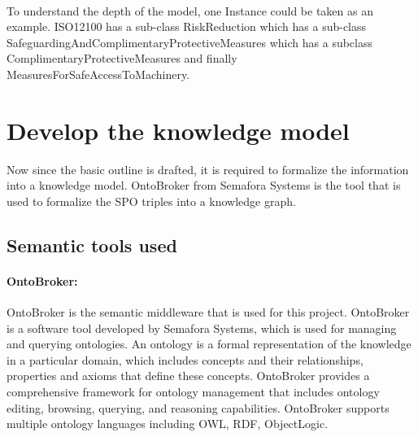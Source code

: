 
\bigskip {}

\paragraph{} To understand the depth of the model, one Instance could be taken as an example. ISO12100 has a sub-class RiskReduction which has a sub-class SafeguardingAndComplimentaryProtectiveMeasures which has a subclass ComplimentaryProtectiveMeasures and finally MeasuresForSafeAccessToMachinery.


\bigskip\bigskip {}

    
\section{Develop the knowledge model}\label{develop}

Now since the basic outline is drafted, it is required to formalize the information into a knowledge model. OntoBroker \cite{ontobroker} from Semafora Systems is the tool that is used to formalize the SPO triples into a knowledge graph. 

\subsection{Semantic tools used}

\paragraph{OntoBroker: } OntoBroker is the semantic middleware that is used for this project. OntoBroker is a software tool developed by Semafora Systems, which is used for managing and querying ontologies. An ontology is a formal representation of the knowledge in a particular domain, which includes concepts and their relationships, properties and axioms that define these concepts. OntoBroker provides a comprehensive framework for ontology management that includes ontology editing, browsing, querying, and reasoning capabilities. OntoBroker supports multiple ontology languages including OWL, RDF, ObjectLogic. 

